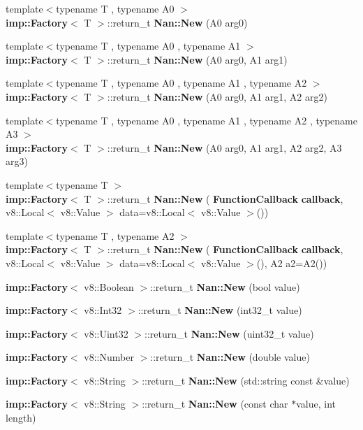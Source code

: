 \begin{DoxyCompactItemize}
\item 
{\footnotesize template$<$typename T , typename A0 $>$ }\\\textbf{ imp\+::\+Factory}$<$ T $>$\+::return\+\_\+t \textbf{ Nan\+::\+New} (A0 arg0)
\item 
{\footnotesize template$<$typename T , typename A0 , typename A1 $>$ }\\\textbf{ imp\+::\+Factory}$<$ T $>$\+::return\+\_\+t \textbf{ Nan\+::\+New} (A0 arg0, A1 arg1)
\item 
{\footnotesize template$<$typename T , typename A0 , typename A1 , typename A2 $>$ }\\\textbf{ imp\+::\+Factory}$<$ T $>$\+::return\+\_\+t \textbf{ Nan\+::\+New} (A0 arg0, A1 arg1, A2 arg2)
\item 
{\footnotesize template$<$typename T , typename A0 , typename A1 , typename A2 , typename A3 $>$ }\\\textbf{ imp\+::\+Factory}$<$ T $>$\+::return\+\_\+t \textbf{ Nan\+::\+New} (A0 arg0, A1 arg1, A2 arg2, A3 arg3)
\item 
{\footnotesize template$<$typename T $>$ }\\\textbf{ imp\+::\+Factory}$<$ T $>$\+::return\+\_\+t \textbf{ Nan\+::\+New} (\textbf{ Function\+Callback} \textbf{ callback}, v8\+::\+Local$<$ v8\+::\+Value $>$ data=v8\+::\+Local$<$ v8\+::\+Value $>$())
\item 
{\footnotesize template$<$typename T , typename A2 $>$ }\\\textbf{ imp\+::\+Factory}$<$ T $>$\+::return\+\_\+t \textbf{ Nan\+::\+New} (\textbf{ Function\+Callback} \textbf{ callback}, v8\+::\+Local$<$ v8\+::\+Value $>$ data=v8\+::\+Local$<$ v8\+::\+Value $>$(), A2 a2=A2())
\item 
\textbf{ imp\+::\+Factory}$<$ v8\+::\+Boolean $>$\+::return\+\_\+t \textbf{ Nan\+::\+New} (bool value)
\item 
\textbf{ imp\+::\+Factory}$<$ v8\+::\+Int32 $>$\+::return\+\_\+t \textbf{ Nan\+::\+New} (int32\+\_\+t value)
\item 
\textbf{ imp\+::\+Factory}$<$ v8\+::\+Uint32 $>$\+::return\+\_\+t \textbf{ Nan\+::\+New} (uint32\+\_\+t value)
\item 
\textbf{ imp\+::\+Factory}$<$ v8\+::\+Number $>$\+::return\+\_\+t \textbf{ Nan\+::\+New} (double value)
\item 
\textbf{ imp\+::\+Factory}$<$ v8\+::\+String $>$\+::return\+\_\+t \textbf{ Nan\+::\+New} (std\+::string const \&value)
\item 
\textbf{ imp\+::\+Factory}$<$ v8\+::\+String $>$\+::return\+\_\+t \textbf{ Nan\+::\+New} (const char $\ast$value, int length)

\end{DoxyCompactItemize}
